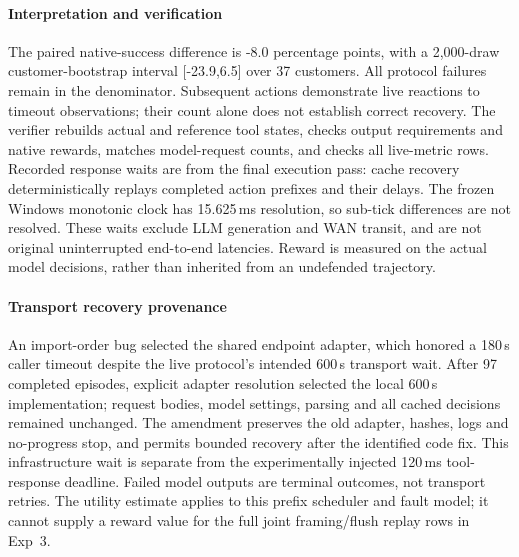 \paragraph{Interpretation and verification}
The paired native-success difference is -8.0 percentage points, with a 2,000-draw customer-bootstrap interval [-23.9,6.5] over 37 customers. All protocol failures remain in the denominator. Subsequent actions demonstrate live reactions to timeout observations; their count alone does not establish correct recovery. The verifier rebuilds actual and reference tool states, checks output requirements and native rewards, matches model-request counts, and checks all live-metric rows. Recorded response waits are from the final execution pass: cache recovery deterministically replays completed action prefixes and their delays. The frozen Windows monotonic clock has 15.625\,ms resolution, so sub-tick differences are not resolved. These waits exclude LLM generation and WAN transit, and are not original uninterrupted end-to-end latencies. Reward is measured on the actual model decisions, rather than inherited from an undefended trajectory.

\paragraph{Transport recovery provenance}
An import-order bug selected the shared endpoint adapter, which honored a 180\,s caller timeout despite the live protocol's intended 600\,s transport wait. After 97 completed episodes, explicit adapter resolution selected the local 600\,s implementation; request bodies, model settings, parsing and all cached decisions remained unchanged. The amendment preserves the old adapter, hashes, logs and no-progress stop, and permits bounded recovery after the identified code fix. This infrastructure wait is separate from the experimentally injected 120\,ms tool-response deadline. Failed model outputs are terminal outcomes, not transport retries. The utility estimate applies to this prefix scheduler and fault model; it cannot supply a reward value for the full joint framing/flush replay rows in Exp~3.
